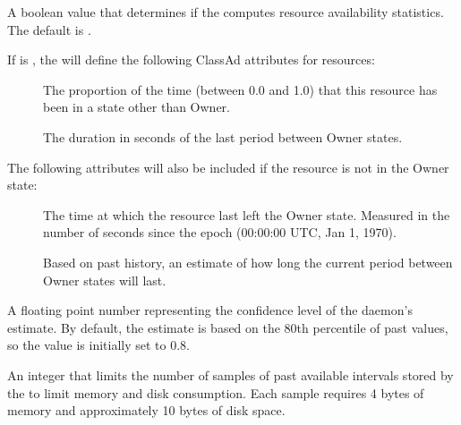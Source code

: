\begin{description}

\label{param:StartdComputeAvailStats}
\item[\Macro{STARTD\_COMPUTE\_AVAIL\_STATS}]
  A boolean value that determines if the  computes resource
  availability statistics.  The default is .

  If  is , 
  the  will
  define the following ClassAd attributes for resources:

  \begin{description}
  \item[]
    The proportion of the time (between 0.0 and 1.0)
    that this resource has been in a state other than Owner.
  \item[]
    The duration in seconds of the last period between Owner states.
  \end{description}

  The following attributes will also be included if the resource is
  not in the Owner state:

  \begin{description}
  \item[]
    The time at which the resource last left the
    Owner state.  Measured in the number of seconds since the
    epoch (00:00:00 UTC, Jan 1, 1970).
  \item[]
    Based on past history, an estimate
    of how long the current period between Owner states will last.
  \end{description}

\label{param:StartdAvailConfidence}
\item[\Macro{STARTD\_AVAIL\_CONFIDENCE}]
  A floating point number representing the confidence level of the
   daemon's  estimate.
  By default, the estimate is based on
  the 80th percentile of past values, so the value is initially set to 0.8.

\label{param:StartdMaxAvailPeriodSamples}
\item[\Macro{STARTD\_MAX\_AVAIL\_PERIOD\_SAMPLES}]
  An integer that limits the number of samples of past available
  intervals stored by the  to limit memory and disk consumption.
  Each sample requires 4 bytes of memory and approximately 10 bytes of
  disk space.

\end{description}

